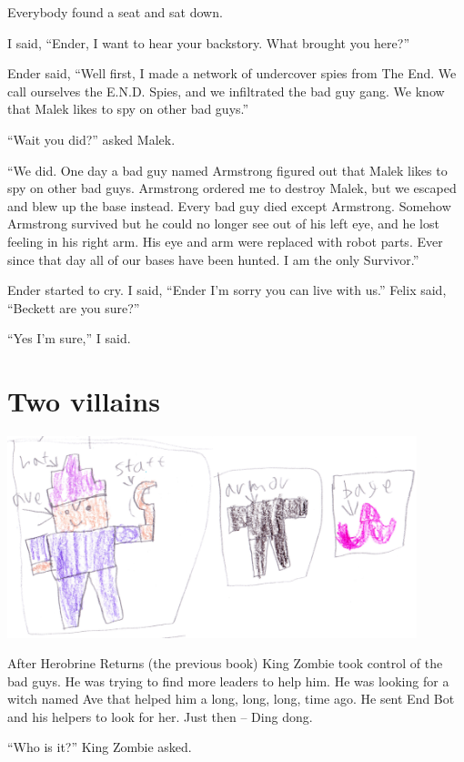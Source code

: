 \documentclass[letterpaper, oneside, 12pt]{krantz}
\begin{document}
Everybody found a seat and sat down.

I said, ``Ender, I want to hear your backstory. What brought you here?''

Ender said, ``Well first, I made a network of undercover spies from The
End. We call ourselves the E.N.D. Spies, and we infiltrated the bad guy
gang. We know that Malek likes to spy on other bad guys.''

``Wait you did?'' asked Malek.

``We did. One day a bad guy named Armstrong figured out that Malek likes
to spy on other bad guys. Armstrong ordered me to destroy Malek, but we
escaped and blew up the base instead. Every bad guy died except
Armstrong. Somehow Armstrong survived but he could no longer see out of
his left eye, and he lost feeling in his right arm. His eye and arm were
replaced with robot parts. Ever since that day all of our bases have
been hunted. I am the only Survivor.''

Ender started to cry. I said, ``Ender I'm sorry you can live with us.''
Felix said, ``Beckett are you sure?''

``Yes I'm sure,'' I said.

\hypertarget{two-villains}{%
\section{Two villains}\label{two-villains}}

\includegraphics[width=4.6875in,height=\textheight]{img/four-bad-guys/avestuff.jpg}

After Herobrine Returns (the previous book) King Zombie took control of
the bad guys. He was trying to find more leaders to help him. He was
looking for a witch named Ave that helped him a long, long, long, time
ago. He sent End Bot and his helpers to look for her. Just then -- Ding
dong.

``Who is it?'' King Zombie asked.
\end{document}
